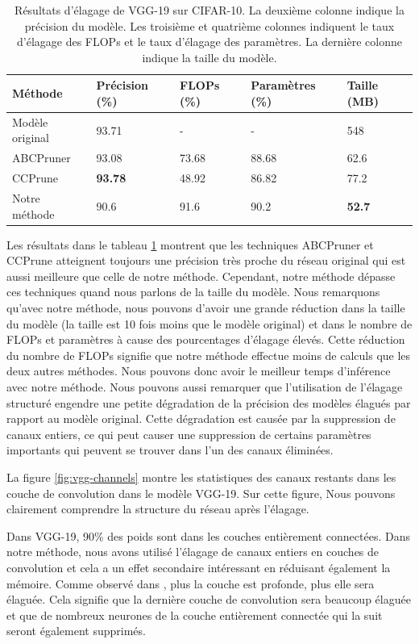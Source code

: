 \begin{table}[h!]
\begin{tabular}{|p{3.25cm}|p{3cm}|p{2.25cm}|p{3cm}|p{2.25cm}|}
\hline
Méthode & Précision (\%) & FLOPs (\%) & Paramètres (\%) & Taille (MB) \\
\hline
Modèle original & 93.71 & - & - & 548 \\
\hline
ABCPruner & 93.08 & 73.68 & 88.68 & 62.6 \\
\hline
CCPrune & \textbf{93.78} & 48.92 & 86.82 & 77.2 \\
\hline
Notre méthode & 90.6 & 91.6 & 90.2 & \textbf{52.7} \\
\hline
\end{tabular}
\caption{Résultats d'élagage de VGG-19 sur CIFAR-10. La deuxième colonne indique la précision du modèle. Les troisième et quatrième colonnes indiquent le taux d'élagage des FLOPs et le taux d'élagage des paramètres. La dernière colonne indique la taille du modèle.}
\label{table:vgg-pruning-results}
\end{table}

Les résultats dans le tableau \ref{table:vgg-pruning-results} montrent que les techniques ABCPruner et CCPrune atteignent toujours une précision très proche du réseau original qui est aussi meilleure que celle de notre méthode. Cependant, notre méthode dépasse ces techniques quand nous parlons de la taille du modèle. Nous remarquons qu'avec notre méthode, nous pouvons d'avoir une grande réduction dans la taille du modèle (la taille est 10 fois moins que le modèle original) et dans le nombre de FLOPs et paramètres à cause des pourcentages d'élagage élevés. Cette réduction du nombre de FLOPs signifie que notre méthode effectue moins de calculs que les deux autres méthodes. Nous pouvons donc avoir le meilleur temps d'inférence avec notre méthode. Nous pouvons aussi remarquer que l'utilisation de l'élagage structuré engendre une petite dégradation de la précision des modèles élagués par rapport au modèle original. Cette dégradation est causée par la suppression de canaux entiers, ce qui peut causer une suppression de certains paramètres importants qui peuvent se trouver dans l'un des canaux éliminées.

La figure \ref{fig:vgg-channels} montre les statistiques des canaux restants dans les couche de convolution dans le modèle VGG-19. Sur cette figure, Nous pouvons clairement comprendre la structure du réseau après l'élagage.

Dans VGG-19, 90\% des poids sont dans les couches entièrement connectées. Dans notre méthode, nous avons utilisé l’élagage de canaux entiers en couches de convolution et cela a un effet secondaire intéressant en réduisant également la mémoire. Comme observé dans \cite{molchanov2016pruning}, plus la couche est profonde, plus elle sera élaguée. Cela signifie que la dernière couche de convolution sera beaucoup élaguée et que de nombreux neurones de la couche entièrement connectée qui la suit seront également supprimés.

